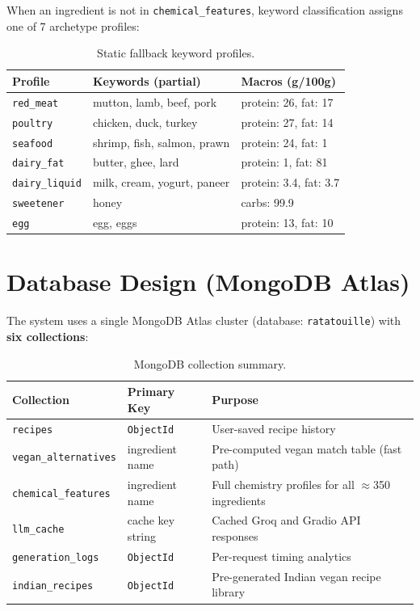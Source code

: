 \documentclass[12pt, a4paper]{article}
\begin{document}
When an ingredient is not in \texttt{chemical\_features}, keyword classification assigns one
of 7 archetype profiles:

\begin{table}[H]
\centering
\caption{Static fallback keyword profiles.}
\label{tab:fallback}
\begin{tabular}{l l l}
\toprule
\textbf{Profile} & \textbf{Keywords (partial)} & \textbf{Macros (g/100g)} \\
\midrule
\texttt{red\_meat}      & mutton, lamb, beef, pork      & protein: 26, fat: 17 \\
\texttt{poultry}        & chicken, duck, turkey         & protein: 27, fat: 14 \\
\texttt{seafood}        & shrimp, fish, salmon, prawn   & protein: 24, fat: 1  \\
\texttt{dairy\_fat}     & butter, ghee, lard            & protein: 1,  fat: 81 \\
\texttt{dairy\_liquid}  & milk, cream, yogurt, paneer   & protein: 3.4, fat: 3.7 \\
\texttt{sweetener}      & honey                         & carbs: 99.9 \\
\texttt{egg}            & egg, eggs                     & protein: 13, fat: 10 \\
\bottomrule
\end{tabular}
\end{table}

\section{Database Design (MongoDB Atlas)}

The system uses a single MongoDB Atlas cluster (database: \texttt{ratatouille}) with
\textbf{six collections}:

\begin{table}[H]
\centering
\caption{MongoDB collection summary.}
\label{tab:collections}
\begin{tabularx}{\textwidth}{l l X}
\toprule
\textbf{Collection} & \textbf{Primary Key} & \textbf{Purpose} \\
\midrule
\texttt{recipes}             & \texttt{ObjectId}    & User-saved recipe history \\
\texttt{vegan\_alternatives} & ingredient name      & Pre-computed vegan match table (fast path) \\
\texttt{chemical\_features}  & ingredient name      & Full chemistry profiles for all $\approx$350 ingredients \\
\texttt{llm\_cache}          & cache key string     & Cached Groq and Gradio API responses \\
\texttt{generation\_logs}    & \texttt{ObjectId}    & Per-request timing analytics \\
\texttt{indian\_recipes}     & \texttt{ObjectId}    & Pre-generated Indian vegan recipe library \\
\bottomrule
\end{tabularx}
\end{table}
\end{document}
